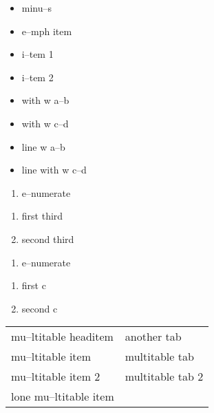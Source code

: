 \documentclass{book}
\begin{document}
\begin{itemize}[label=-]
\item minu--s
\end{itemize}

\begin{itemize}[label=\emph{after emph}]
\item e--mph item
\end{itemize}

\begin{itemize}[label=\textbullet{} a--n itemize line]
\item {}%
i--tem 1
\item i--tem 2
\end{itemize}

\begin{itemize}[label={}]
\item with w a--b
\item with w c--d
\end{itemize}

\begin{itemize}[label=\hbox{} on a line]
\item line w a--b
\item line with w c--d
\end{itemize}

\begin{enumerate}[start=1]
\item e--numerate
\end{enumerate}

\begin{enumerate}[start=3]
\item first third
\item second third
\end{enumerate}

\begin{enumerate}[label=\alph*.]
\item e--numerate
\end{enumerate}

\begin{enumerate}[label=\alph*.,start=3]
\item first c
\item second c
\end{enumerate}

\begin{tabular}{m{} m{}}%
mu--ltitable headitem &another tab\\
mu--ltitable item &multitable tab\\
mu--ltitable item 2 &multitable tab 2
\index[cp]{index entry within multitable}%
\\
lone mu--ltitable item&\\
\end{tabular}%
\end{document}
